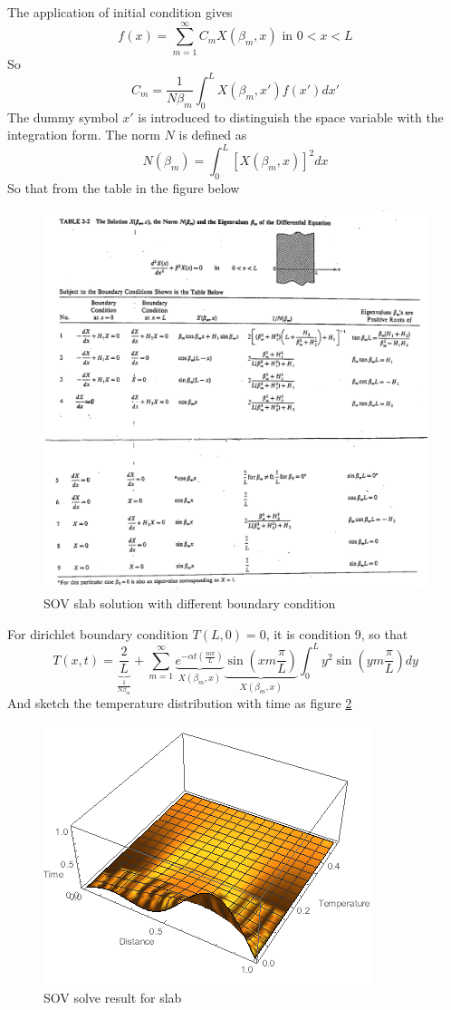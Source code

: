 \begin{solution}
The application of initial condition gives
$$f(x)=\sum_{m=1}^{\infty} C_m X(\beta_m,x) \text{ in } 0<x<L$$
So 
$$C_m=\frac{1}{N\beta_m}\int_0^L X(\beta_m,x')f(x')dx'$$
The dummy symbol $x'$ is introduced to distinguish the space variable with the integration form. The norm $N$ is defined as
$$N(\beta_m)=\int_0^L [X(\beta_m,x)]^2dx$$
So that from the table in the figure below
\begin{figure}[H]
  \centering
    \includegraphics[scale=0.6]{figures/ch4/7}
    \caption{SOV slab solution with different boundary condition}
    \label{fig:4:7}
\end{figure}

For dirichlet boundary condition $T(L,0)=0$, it is condition 9, so that
\[
 T(x,t) = 
   \underbrace{\frac{2}{L}}_{\frac{1}{N\beta_m}} +\sum_{m=1}^{\infty}
   \underbrace{e^{-\alpha t \left(\frac{m\pi}{L}\right)}}_{X(\beta_m,x)}
   \underbrace{\sin\left(xm\frac{\pi}{L}\right)}_{X(\beta_m,x)}
   \int_0^L{y^2 \sin\left(ym\frac{\pi}{L}\right)}dy
\]
And sketch the temperature distribution with time as figure \ref{fig:4:8}
\begin{figure}[H]
  \centering
    \includegraphics[scale=1]{figures/ch4/8}
    \caption{SOV solve result for slab}
    \label{fig:4:8}
\end{figure}
\end{solution}


